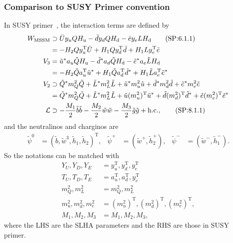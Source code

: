\documentclass[a4paper,11pt,captions=tableheading,DIV=12]{scrartcl}
\newcommand\w[1]{_{\mathrm{#1}}}
\newcommand{\tra}{^{\mathrm T}}
\begin{document}
\subsubsection{Comparison to SUSY Primer convention}
In SUSY primer~\cite{Martin:1997ns}, the interaction terms are defined by
\begin{align}
 W\w{MSSM}
&\supset \bar U y_u Q H\w u - \bar d y_d Q H\w d - \bar e y_e L H\w d
\tag{SP:6.1.1}\\
&=
 -H_2Q y_u\tra \bar U + H_1 Qy_d\tra\bar d  +H_1 Ly_e\tra\bar e
\notag\\
V_3 &=
 \tilde u^* a_u \tilde Q H\w u
-\tilde d^* a_d \tilde Q H\w d
-\tilde e^* a_e \tilde L H\w d
\notag\\
&=
-H_2 \tilde Q a_u\tra \tilde u^*
+H_1 \tilde Q a_d\tra \tilde d^*
+H_1 \tilde L a_e\tra \tilde e^*
\notag\\
V_2 &\supset
 \tilde Q^* m_Q^2 \tilde Q
+\tilde L^* m_L^2 \tilde L
+\tilde u^* m_u^2 \tilde u
+\tilde d^* m_d^2 \tilde d
+\tilde e^* m_e^2 \tilde e
\notag\\
&=
 \tilde Q^* m_Q^2 \tilde Q
+\tilde L^* m_L^2 \tilde L
+\tilde u (m_u^2)\tra \tilde u^*
+\tilde d (m_d^2)\tra \tilde d^*
+\tilde e (m_e^2)\tra \tilde e^*
\notag\\
\mathcal L&\supset
-\frac{M_1}{2}\tilde b\tilde b-\frac{M_2}{2}\tilde w\tilde w-\frac{M_3}{2}\tilde g\tilde g + \text{h.c.},\tag{SP:8.1.1}
\end{align}
and the neutralinos and charginos are
\begin{align}
 \tilde\psi^0&=(\tilde b,\tilde w^3,\tilde h_1,\tilde h_2)\tra,
&
\tilde\psi^+&=(\tilde w^+,\tilde h_2^+),
&
\tilde\psi^-&=(\tilde w^-,\tilde h_1^-).
\tag{SP:8.2.1+15}
\end{align}
So the notations can be matched with
\begin{align}
 Y_U, Y_D, Y_E &= y_u\tra, y_d\tra, y_e\tra\\
 T_U, T_D, T_E &= a_u\tra, a_d\tra, y_e\tra\\
 m_Q^2, m_L^2  &= m_Q^2, m_L^2\\
 m_u^2, m_d^2, m_e^2  &= (m_u^2)\tra,(m_d^2)\tra,(m_e^2)\tra,\\
 M_1, M_2, M_3 &= M_1, M_2, M_3,
\end{align}
where the LHS are the SLHA parameters and the RHS are those in SUSY primer.



\end{document}
